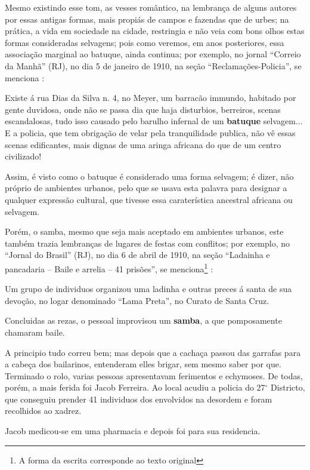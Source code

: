 Mesmo existindo esse tom, as vesses romântico, 
na lembrança de alguns autores por essas antigas formas,
mais propiás de campos e fazendas que de urbes;
na prática, a vida em sociedade na cidade, 
restringia e não veia com bons olhos estas formas consideradas selvagens;
pois como veremos, em anos posteriores, essa associação marginal ao batuque, ainda continua;
por exemplo, no jornal ``Correio da Manhã'' (RJ), 
no dia 5 de janeiro de 1910, na seção ``Reclamações-Policia'',
se menciona \cite[pp. 4]{batuqueperiodicocorreiomanha}:
\begin{citando}%
Existe á rua Dias da Silva n. 4, no 
Meyer, um barracão immundo, habitado por
gente duvidosa, onde não se passa dia que 
haja disturbios, berreiros, scenas 
escandalosas, tudo isso causado pelo barulho
infernal de um \textbf{batuque} selvagem... E a 
policia, que tem obrigação de velar pela 
tranquilidade publica, não vê essas scenas
edificantes, mais dignas de uma aringa 
africana do que de um centro civilizado!
\end{citando}
Assim, é visto como o batuque é considerado uma forma selvagem;
é dizer, não próprio de ambientes urbanos,
pelo que se usava esta palavra para designar a qualquer expressão cultural,
 que tivesse essa caraterística ancestral africana ou selvagem. 

Porém, o samba, mesmo que seja mais aceptado em ambientes urbanos,
este também trazia lembranças de lugares de festas com conflitos;
por exemplo, no ``Jornal do Brasil'' (RJ), 
no dia 6 de abril de 1910, na seção ``Ladainha e pancadaria -- Baile e arrelia -- 41 prisões'',
se menciona\footnote{\label{footort5}A forma da escrita corresponde ao texto original} \cite[pp. 12]{batuqueperiodicojornaldobrasil}:
\begin{citando}%
Um grupo de individuos organizou
uma ladinha e outras preces 
á santa de sua devoção, no logar 
denominado ``Lama Preta'', no 
Curato de Santa Cruz.

Concluidas as rezas, o pessoal 
improvisou um \textbf{samba}, a que 
pomposamente chamaram baile.

A principio tudo correu bem;
mas depois que a cachaça passou
das garrafas para a cabeça dos 
bailarinos, entenderam elles 
brigar, sem mesmo saber por que.
Terminado o rolo, varias 
pessoas apresentavam ferimentos e echymoses.
De todas, porém, a mais ferida foi Jacob Ferreira.
Ao local acudiu a policia do 27$^{\circ}$ 
Districto, que conseguiu prender 
41 individuos dos envolvidos na 
desordem e foram recolhidos ao xadrez.

Jacob medicou-se em uma pharmacia e depois foi para sua residencia.
\end{citando}


